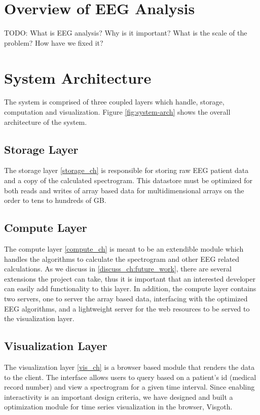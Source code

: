 \section{Overview of EEG Analysis}

TODO:
What is EEG analysis? Why is it important? What is the scale of the problem? How have we fixed it?

\section{System Architecture}

The system is comprised of three coupled layers which handle, storage,
computation and visualization. Figure \ref{fig:system-arch} shows the overall
architecture of the system.

\subsection{Storage Layer}

The storage layer \ref{storage_ch} is responsible for storing raw EEG patient
data and a copy of the calculated spectrogram. This datastore must be optimized
for both reads and writes of array based data for multidimensional arrays on
the order to tens to hundreds of GB.

\subsection{Compute Layer}

The compute layer \ref{compute_ch} is meant to be an extendible module which
handles the algorithms to calculate the spectrogram and other EEG related
calculations. As we discuss in \ref{discuss_ch:future_work}, there are several
extensions the project can take, thus it is important that an interested
developer can easily add functionality to this layer. In addition, the compute
layer contains two servers, one to server the array based data, interfacing
with the optimized EEG algorithms, and a lightweight server for the web
resources to be served to the visualization layer.

\subsection{Visualization Layer}

The visualization layer \ref{vis_ch} is a browser based module that renders the
data to the client. The interface allows users to query based on a patient's id
(medical record number) and view a spectrogram for a given time interval. Since
enabling interactivity is an important design criteria, we have designed and
built a optimization module for time series visualization in the browser,
Visgoth.

